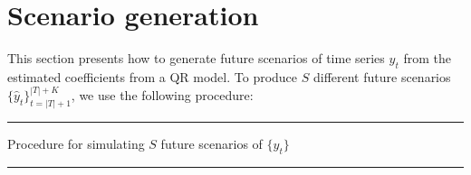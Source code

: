 




\section{Scenario generation} \label{sec:scenario-generation}

This section presents how to generate future scenarios of time series $y_t$ from the estimated coefficients from a QR model. 
To produce $S$ different future scenarios $\{ \hat{y}_t \}_{t=|T|+1}^{|T|+K}$, we use the following procedure:

\noindent\rule{\columnwidth}{3pt}

Procedure for simulating $S$ future scenarios of $\{y_t\}$

\noindent\rule{\columnwidth}{1pt}

